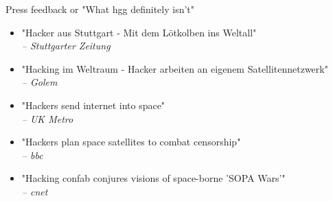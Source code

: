 	\begin{frame}{Press feedback or "What hgg definitely isn't"}
		\begin{itemize}
			\item "Hacker aus Stuttgart - Mit dem Lötkolben ins Weltall"\\ \footnotesize{\emph{-- Stuttgarter Zeitung}}
			\item "Hacking im Weltraum - Hacker arbeiten an eigenem Satellitennetzwerk"\\ \footnotesize{\emph{-- Golem}}
			\item "Hackers send internet into space"\\ \footnotesize{\emph{-- UK Metro}}
			\item "Hackers plan space satellites to combat censorship"\\ \footnotesize{\emph{-- bbc}}
			\item "Hacking confab conjures visions of space-borne 'SOPA Wars'"\\ \footnotesize{\emph{-- cnet}}
		\end{itemize}
	\end{frame}

